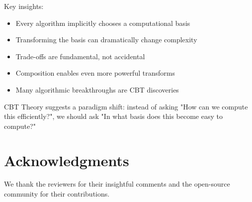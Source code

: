 \documentclass[12pt,a4paper]{article}
\theoremstyle{definition}
\begin{document}
Key insights:
\begin{itemize}
\item Every algorithm implicitly chooses a computational basis
\item Transforming the basis can dramatically change complexity
\item Trade-offs are fundamental, not accidental
\item Composition enables even more powerful transforms
\item Many algorithmic breakthroughs are CBT discoveries
\end{itemize}

CBT Theory suggests a paradigm shift: instead of asking "How can we compute this efficiently?", we should ask "In what basis does this become easy to compute?"

\section*{Acknowledgments}

We thank the reviewers for their insightful comments and the open-source community for their contributions.



\end{document}
